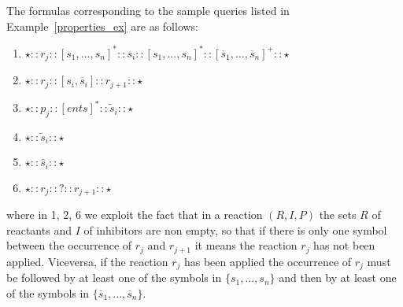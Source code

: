 
\begin{example}
The formulas corresponding to the sample queries listed in Example~\ref{properties_ex} are as follows:
\begin{enumerate}
\item
$\star :: r_j :: [ s_1,...,s_n ]^* :: s_i :: [  s_1,...,s_n ]^* :: [  \overline{s}_1,...,\overline{s}_n ]^+ :: \star$
\item
$\star :: r_j :: [s_i, \overline{s}_i] :: r_{j+1} :: \star$
\item
$\star :: p_j :: [  \mathit{ents} ]^* :: \widetilde{s}_i :: \star$
\item
$\star :: \widetilde{s}_i :: \star$
\item
$\star :: \widehat{s}_i :: \star$
\item
$\star :: r_j :: ? :: r_{j+1} :: \star$
\end{enumerate}
where in 1, 2, 6 we exploit the fact that in a reaction $(R,I,P)$ the sets $R$ of reactants and  $I$ of inhibitors are non empty, so that if there is only one symbol between the occurrence of $r_j$ and $r_{j+1}$ it means the reaction $r_j$ has not been applied. Viceversa, if the reaction $r_j$ has been applied the occurrence of $r_j$ must be followed by at least one of the symbols in $\{s_1,...,s_n\}$ and then by at least one of the symbols in $\{\overline{s}_1,...,\overline{s}_n\}$.
\end{example}

